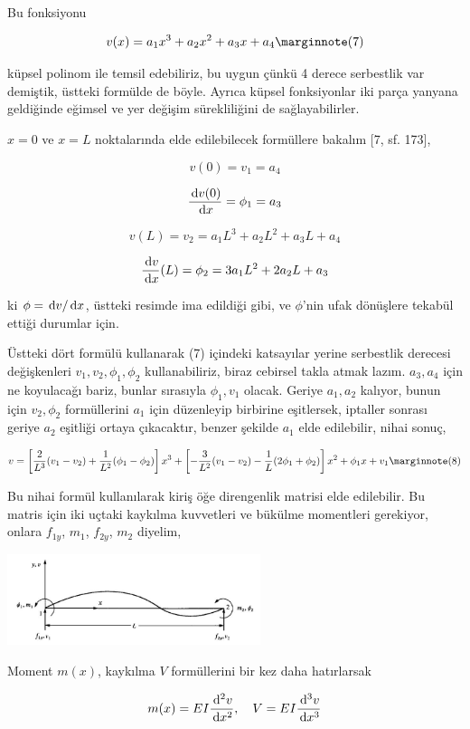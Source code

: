 \documentclass[12pt,fleqn]{article}\usepackage{../../common}
\begin{document}
Bu fonksiyonu

$$
v(x) = a_1 x^3 + a_2 x^2 + a_3 x + a_4
\mlabel{7}
$$

küpsel polinom ile temsil edebiliriz, bu uygun çünkü 4 derece serbestlik var
demiştik, üstteki formülde de böyle. Ayrıca küpsel fonksiyonlar iki parça
yanyana geldiğinde eğimsel ve yer değişim sürekliliğini de sağlayabilirler.

$x=0$ ve $x=L$ noktalarında elde edilebilecek formüllere bakalım [7, sf. 173],

$$
v(0) = v_1 = a_4
$$

$$
\frac{\,\mathrm{d} v(0)}{\,\mathrm{d} x} = \phi_1 = a_3
$$

$$
v(L) = v_2 = a_1 L^3 + a_2 L^2 + a_3 L + a_4 
$$

$$
\frac{\,\mathrm{d} v}{\,\mathrm{d} x}(L) = \phi_2 = 3 a_1 L^2 + 2 a_2 L + a_3
$$

ki $\phi = \,\mathrm{d} v / \,\mathrm{d} x$, üstteki resimde ima edildiği gibi, ve $\phi$'nin
ufak dönüşlere tekabül ettiği durumlar için.

Üstteki dört formülü kullanarak (7) içindeki katsayılar yerine serbestlik
derecesi değişkenleri $v_1,v_2,\phi_1,\phi_2$ kullanabiliriz, biraz cebirsel
takla atmak lazım. $a_3,a_4$ için ne koyulacağı bariz, bunlar sırasıyla
$\phi_1,v_1$ olacak. Geriye $a_1,a_2$ kalıyor, bunun için $v_2,\phi_2$
formüllerini $a_1$ için düzenleyip birbirine eşitlersek, iptaller sonrası
geriye $a_2$ eşitliği ortaya çıkacaktır, benzer şekilde $a_1$ elde edilebilir,
nihai sonuç,

$$
v =
\left[
  \frac{2}{L^3} (v_1 - v_2) + \frac{1}{L^2} (\phi_1 - \phi_2) 
\right] x^3 +
\left[
  -\frac{3}{L^2} (v_1 - v_2) - \frac{1}{L} (2\phi_1 + \phi_2)
\right] x^2 +
\phi_1 x + v_1
\mlabel{8}
$$

Bu nihai formül kullanılarak kiriş öğe direngenlik matrisi elde
edilebilir. Bu matris için iki uçtaki kaykılma kuvvetleri ve
bükülme momentleri gerekiyor, onlara $f_{1y}$, $m_1$, $f_{2y}$,
$m_2$ diyelim,

\includegraphics[width=20em]{phy_020_strs_05_10.jpg}

Moment $m(x)$, kaykılma $V$ formüllerini bir kez daha hatırlarsak

$$
m(x) = EI \frac{\,\mathrm{d}^2 v}{\,\mathrm{d} x^2}, \quad
V = EI \frac{\,\mathrm{d}^3 v}{\,\mathrm{d} x^3}
$$
\end{document}
